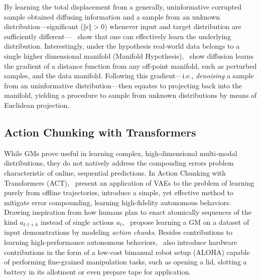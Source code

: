By learning the total displacement from a generally, uninformative corrupted sample obtained diffusing information and a sample from an unknown distribution---significant (\( \Vert \epsilon \Vert > 0 \)) whenever input and target distribution are sufficiently different---~\citet{hoDenoisingDiffusionProbabilistic2020} show that one can effectively learn the underlying distribution.
Interestingly, under the hypothesis real-world data belongs to a single higher dimensional manifold (Manifold Hypothesis),~\citet{permenterInterpretingImprovingDiffusion2024} show diffusion learns the gradient of a distance function from any off-point manifold, such as perturbed samples, and the data manifold. 
Following this gradient---i.e., \emph{denoising} a sample from an uninformative distribution---then equates to projecting back into the manifold, yielding a procedure to sample from unknown distributions by means of Euclidean projection.



\subsection{Action Chunking with Transformers}
While GMs prove useful in learning complex, high-dimensional multi-modal distributions, they do not natively address the compouding errors problem characteristic of online, sequential predictions.
In Action Chunking with Transformers (ACT),~\citet{zhaoLearningFineGrainedBimanual2023} present an application of VAEs to the problem of learning purely from offline trajectories, introduce a simple, yet effective method to mitigate error compounding, learning high-fidelity autonomous behaviors.
Drawing inspiration from how humans plan to enact atomically sequences of the kind \( a_{t:t+k} \) instead of single actions \( a_t \),~\citet{zhaoLearningFineGrainedBimanual2023} propose learning a GM on a dataset of input demonstrations by modeling \emph{action chunks}.
Besides contributions to learning high-performance autonomous behaviors,~\citet{zhaoLearningFineGrainedBimanual2023} also introduce hardware contributions in the form of a low-cost bimanual robot setup (ALOHA) capable of performing fine-grained manipulation tasks, such as opening a lid, slotting a battery in its allotment or even prepare tape for application.


